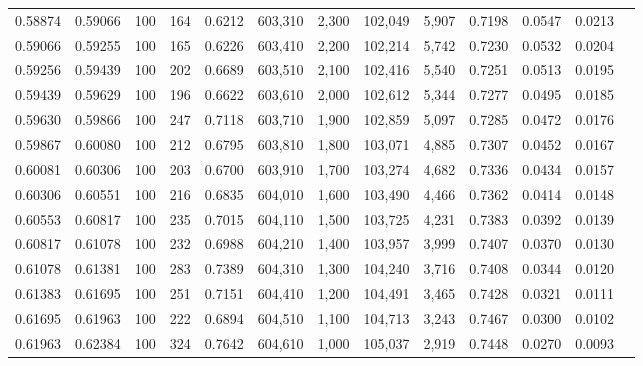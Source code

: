 \begin{tabular}{rrrrrrrrrrrrr}
0.58874 & 0.59066 &    100 & 164 &                                     0.6212 & 603,310 &   2,300 & 102,049 &   5,907 & 0.7198 & 0.0547 & 0.0213 \\
0.59066 & 0.59255 &    100 & 165 &                                     0.6226 & 603,410 &   2,200 & 102,214 &   5,742 & 0.7230 & 0.0532 & 0.0204 \\
0.59256 & 0.59439 &    100 & 202 &                                     0.6689 & 603,510 &   2,100 & 102,416 &   5,540 & 0.7251 & 0.0513 & 0.0195 \\
0.59439 & 0.59629 &    100 & 196 &                                     0.6622 & 603,610 &   2,000 & 102,612 &   5,344 & 0.7277 & 0.0495 & 0.0185 \\
0.59630 & 0.59866 &    100 & 247 &                                     0.7118 & 603,710 &   1,900 & 102,859 &   5,097 & 0.7285 & 0.0472 & 0.0176 \\
0.59867 & 0.60080 &    100 & 212 &                                     0.6795 & 603,810 &   1,800 & 103,071 &   4,885 & 0.7307 & 0.0452 & 0.0167 \\
0.60081 & 0.60306 &    100 & 203 &                                     0.6700 & 603,910 &   1,700 & 103,274 &   4,682 & 0.7336 & 0.0434 & 0.0157 \\
0.60306 & 0.60551 &    100 & 216 &                                     0.6835 & 604,010 &   1,600 & 103,490 &   4,466 & 0.7362 & 0.0414 & 0.0148 \\
0.60553 & 0.60817 &    100 & 235 &                                     0.7015 & 604,110 &   1,500 & 103,725 &   4,231 & 0.7383 & 0.0392 & 0.0139 \\
0.60817 & 0.61078 &    100 & 232 &                                     0.6988 & 604,210 &   1,400 & 103,957 &   3,999 & 0.7407 & 0.0370 & 0.0130 \\
0.61078 & 0.61381 &    100 & 283 &                                     0.7389 & 604,310 &   1,300 & 104,240 &   3,716 & 0.7408 & 0.0344 & 0.0120 \\
0.61383 & 0.61695 &    100 & 251 &                                     0.7151 & 604,410 &   1,200 & 104,491 &   3,465 & 0.7428 & 0.0321 & 0.0111 \\
0.61695 & 0.61963 &    100 & 222 &                                     0.6894 & 604,510 &   1,100 & 104,713 &   3,243 & 0.7467 & 0.0300 & 0.0102 \\
0.61963 & 0.62384 &    100 & 324 &                                     0.7642 & 604,610 &   1,000 & 105,037 &   2,919 & 0.7448 & 0.0270 & 0.0093 \\

\end{tabular}
